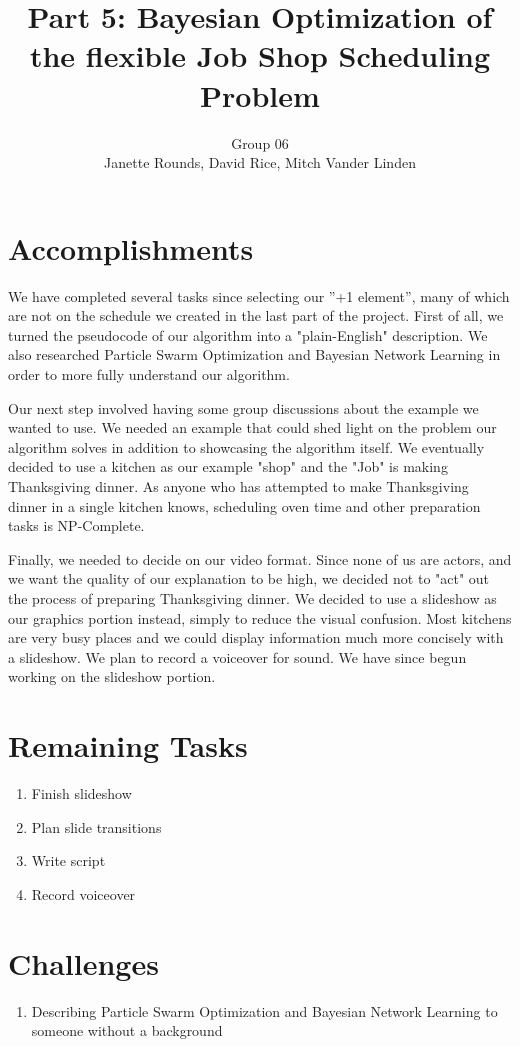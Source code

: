 \documentclass[11pt,twocolumn]{article}
\title{Part 5: Bayesian Optimization of the flexible Job Shop Scheduling Problem}
\author{Group 06 \\ 
\small Janette Rounds, \small David Rice, \small Mitch Vander Linden}
\begin{document}
	\section{Accomplishments}
	
	We have completed several tasks since selecting our ''+1 element'', many of which are not on the schedule we created in the last part of the project. First of all, we turned the pseudocode of our algorithm into a "plain-English" description. We also researched Particle Swarm Optimization and Bayesian Network Learning in order to more fully understand our algorithm. 
	
	Our next step involved having some group discussions about the example we wanted to use. We needed an example that could shed light on the problem our algorithm solves in addition to showcasing the algorithm itself. We eventually decided to use a kitchen as our example "shop" and the "Job" is making Thanksgiving dinner. As anyone who has attempted to make Thanksgiving dinner in a single kitchen knows, scheduling oven time and other preparation tasks is NP-Complete. 
	
	Finally, we needed to decide on our video format. Since none of us are actors, and we want the quality of our explanation to be high, we decided not to "act" out the process of preparing Thanksgiving dinner. We decided to use a slideshow as our graphics portion instead, simply to reduce the visual confusion. Most kitchens are very busy places and we could display information much more concisely with a slideshow. We plan to record a voiceover for sound. We have since begun working on the slideshow portion. 
	
	\section{Remaining Tasks}
	\begin{enumerate}
		\item Finish slideshow
		\item Plan slide transitions
		\item Write script
		\item Record voiceover
	\end{enumerate}
	\section{Challenges}
	\begin{enumerate}
		\item Describing Particle Swarm Optimization and Bayesian Network Learning to someone without a background 
	\end{enumerate}
\end{document}
